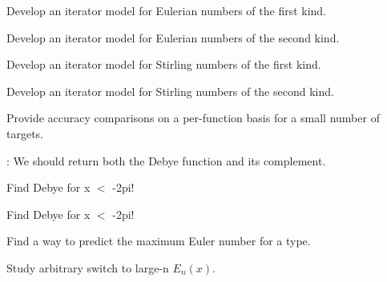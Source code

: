 
\begin{DoxyRefList}
\item[\label{todo__todo000002}%
\Hypertarget{todo__todo000002}%
Member \hyperlink{group__gnu__math__spec__func_gadfd8810a97655d2cdd1b0e3af68a79d3}{\+\_\+\+\_\+gnu\+\_\+cxx\+:\+:eulerian\+\_\+1} (unsigned int \+\_\+\+\_\+n, unsigned int \+\_\+\+\_\+m)]Develop an iterator model for Eulerian numbers of the first kind.  
\item[\label{todo__todo000003}%
\Hypertarget{todo__todo000003}%
Member \hyperlink{group__gnu__math__spec__func_ga9bc456941d5e35cf54ec9c50f2e52884}{\+\_\+\+\_\+gnu\+\_\+cxx\+:\+:eulerian\+\_\+2} (unsigned int \+\_\+\+\_\+n, unsigned int \+\_\+\+\_\+m)]Develop an iterator model for Eulerian numbers of the second kind.  
\item[\label{todo__todo000004}%
\Hypertarget{todo__todo000004}%
Member \hyperlink{group__gnu__math__spec__func_ga2b955dac7d2c5125f2091eaeb25c8ad2}{\+\_\+\+\_\+gnu\+\_\+cxx\+:\+:stirling\+\_\+1} (unsigned int \+\_\+\+\_\+n, unsigned int \+\_\+\+\_\+m)]Develop an iterator model for Stirling numbers of the first kind.  
\item[\label{todo__todo000005}%
\Hypertarget{todo__todo000005}%
Member \hyperlink{group__gnu__math__spec__func_ga3761c0e467cbe45cbda66a4e796adcd3}{\+\_\+\+\_\+gnu\+\_\+cxx\+:\+:stirling\+\_\+2} (unsigned int \+\_\+\+\_\+n, unsigned int \+\_\+\+\_\+m)]Develop an iterator model for Stirling numbers of the second kind.  
\item[\label{todo__todo000001}%
\Hypertarget{todo__todo000001}%
page \hyperlink{index}{Mathematical Special Functions} ]Provide accuracy comparisons on a per-\/function basis for a small number of targets. 
\item[\label{todo__todo000020}%
\Hypertarget{todo__todo000020}%
Member \hyperlink{namespacestd_1_1____detail_a26d3f285cfbcaba6fa30d3e4164c6187}{std\+:\+:\+\_\+\+\_\+detail\+:\+:\+\_\+\+\_\+debye} (unsigned int \+\_\+\+\_\+n, \+\_\+\+Tp \+\_\+\+\_\+x)]\+: We should return both the Debye function and it\textquotesingle{}s complement. 

Find Debye for x $<$ -\/2pi! 

Find Debye for x $<$ -\/2pi!  
\item[\label{todo__todo000008}%
\Hypertarget{todo__todo000008}%
Member \hyperlink{namespacestd_1_1____detail_a2e3eb67dee4d0b5c96824a4e8e9c227e}{std\+:\+:\+\_\+\+\_\+detail\+:\+:\+\_\+\+\_\+euler\+\_\+series} (unsigned int \+\_\+\+\_\+n)]Find a way to predict the maximum Euler number for a type.  
\item[\label{todo__todo000011}%
\Hypertarget{todo__todo000011}%
Member \hyperlink{namespacestd_1_1____detail_a0282700710ec07b8ca095fe2ec140d6e}{std\+:\+:\+\_\+\+\_\+detail\+:\+:\+\_\+\+\_\+expint} (unsigned int \+\_\+\+\_\+n, \+\_\+\+Tp \+\_\+\+\_\+x)]Study arbitrary switch to large-\/n $ E_n(x) $. 


\end{DoxyRefList}
